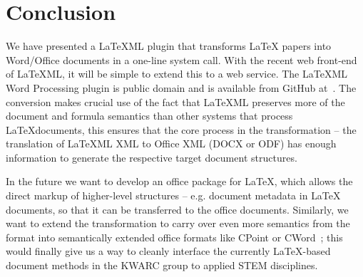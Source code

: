 \documentclass{llncs}
\def\latexml{{\LaTeX}ML\xspace}
\begin{document}

\section{Conclusion}\label{sec:concl}
We have presented a \latexml plugin that transforms {\LaTeX} papers into Word/Office
documents in a one-line system call. With the recent web front-end of \latexml, it will be
simple to extend this to a web service. The \latexml Word Processing plugin is public
domain and is available from GitHub at~\cite{LaTeX2Office:github:on}. The conversion makes
crucial use of the fact that \latexml preserves more of the document and formula semantics
than other systems that process \LaTeX documents, this ensures that the core process in
the transformation -- the translation of \latexml XML to Office XML (DOCX or ODF) has
enough information to generate the respective target document structures.

In the future we want to develop an office package for \LaTeX, which allows the direct
markup of higher-level structures -- e.g. document metadata in {\LaTeX} documents, so that
it can be transferred to the office documents. Similarly, we want to extend the
transformation to carry over even more semantics from the \stex format into semantically
extended office formats like CPoint or
CWord~\cite{Kohlhase:SemanticInteractionDesignDiss:biblatex}; this would finally give us a
way to cleanly interface the currently {\LaTeX}-based document methods in the KWARC group
to applied STEM disciplines.

\printbibliography
\end{document}
